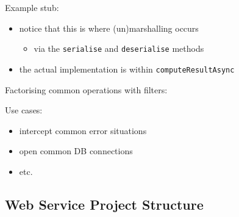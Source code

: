 \documentclass[presentation]{beamer}\mode<presentation>{\usetheme{AMSBolognaFC}}
\begin{document}
\begin{frame}[allowframebreaks]
    \framebreak

    Example stub:
    
    \begin{itemize}
        \item notice that this is where \alert{(un)marshalling} occurs
        \begin{itemize}
            \item via the \texttt{serialise} and \texttt{deserialise} methods
        \end{itemize}

        \item the actual implementation is within \texttt{computeResultAsync}
    \end{itemize}

    \framebreak

    Factorising common operations with \alert{filters}:
    
    Use cases:
    \begin{itemize}
        \item intercept common error situations
        \item open common DB connections
        \item etc.
    \end{itemize}

\end{frame}

\subsection{Web Service Project Structure}
\end{document}
